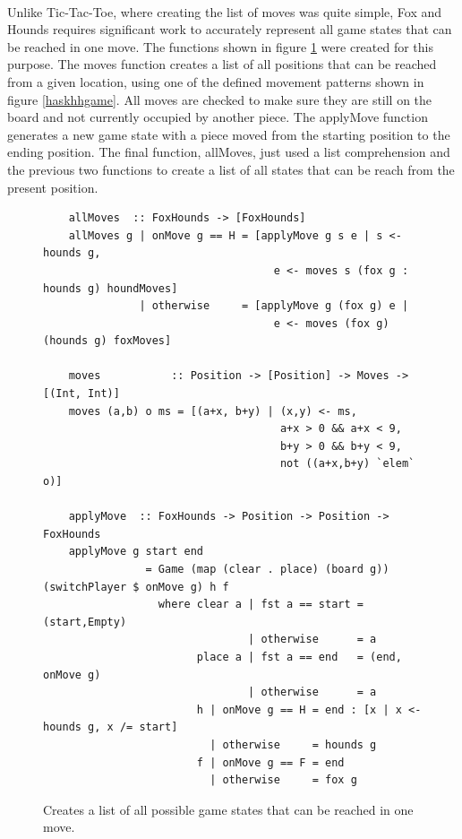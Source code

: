 \documentclass[10pt]{article}
\begin{document}
    \paragraph{} Unlike Tic-Tac-Toe, where creating the list of moves was quite
    simple, Fox and Hounds requires significant work to accurately represent all
    game states that can be reached in one move.  The functions shown in figure 
    \ref{hhmoves} were created for this purpose.  The moves function creates a list of
    all positions that can be reached from a given location, using one of the defined 
    movement patterns shown in figure \ref{haskhhgame}.  All moves are checked to 
    make sure they are still on the board and not currently occupied by another piece.
    The applyMove function generates a new game state with a piece moved from the 
    starting position to the ending position.  The final function, allMoves, just 
    used a list comprehension and the previous two functions to create a list
    of all states that can be reach from the present position.

    \begin{figure}[ht]
        \centering
        \begin{verbatim}
    allMoves  :: FoxHounds -> [FoxHounds]
    allMoves g | onMove g == H = [applyMove g s e | s <- hounds g, 
                                    e <- moves s (fox g : hounds g) houndMoves]
               | otherwise     = [applyMove g (fox g) e | 
                                    e <- moves (fox g) (hounds g) foxMoves]

    moves           :: Position -> [Position] -> Moves -> [(Int, Int)]
    moves (a,b) o ms = [(a+x, b+y) | (x,y) <- ms, 
                                     a+x > 0 && a+x < 9,
                                     b+y > 0 && b+y < 9, 
                                     not ((a+x,b+y) `elem` o)]

    applyMove  :: FoxHounds -> Position -> Position -> FoxHounds
    applyMove g start end
                = Game (map (clear . place) (board g)) (switchPlayer $ onMove g) h f
                  where clear a | fst a == start = (start,Empty)
                                | otherwise      = a
                        place a | fst a == end   = (end, onMove g)
                                | otherwise      = a
                        h | onMove g == H = end : [x | x <- hounds g, x /= start]
                          | otherwise     = hounds g
                        f | onMove g == F = end
                          | otherwise     = fox g        \end{verbatim}
        \caption{Creates a list of all possible game states that can be reached
        in one move.} \label{hhmoves}
    \end{figure}
\end{document}
